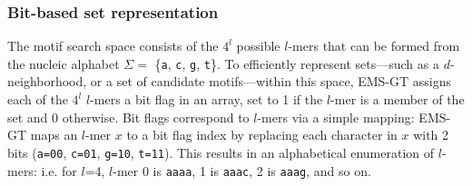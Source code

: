 \documentclass[oneside,12pt]{DISCSthesis}
\begin{document}
		\subsubsection{Bit-based set representation}
			The motif search space consists of the $4^{l}$ possible $l$-mers that can be formed from the nucleic alphabet $\Sigma=$ \{\texttt{a}, \texttt{c}, \texttt{g}, \texttt{t}\}. To efficiently represent sets---such as a $d$-neighborhood, or a set of candidate motifs---within this space, EMS-GT assigns each of the $4^{l}$ $l$-mers a bit flag in an array, set to 1 if the $l$-mer is a member of the set and 0 otherwise. Bit flags correspond to $l$-mers via a simple mapping: EMS-GT maps an $l$-mer $x$ to a bit flag index by replacing each character in $x$ with 2 bits (\texttt{a=00}, \texttt{c=01}, \texttt{g=10}, \texttt{t=11}). This results in an alphabetical enumeration of $l$-mers: i.e. for $l$=4, $l$-mer 0 is \texttt{aaaa}, 1 is \texttt{aaac}, 2 is \texttt{aaag}, and so on.\vspace*{3mm}
\end{document}
